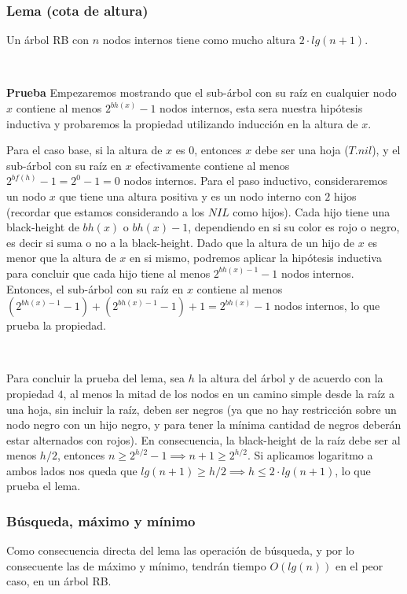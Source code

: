\subsubsection{Lema (cota de altura)}
Un \'arbol RB con $n$ nodos internos tiene como mucho altura $2\cdot lg(n+1)$.

~

\textbf{Prueba} Empezaremos mostrando que el sub-\'arbol con su ra\'iz en cualquier nodo $x$ contiene al menos $2^{bh(x)}-1$ nodos internos, esta sera nuestra hip\'otesis inductiva y probaremos la propiedad utilizando inducci\'on en la altura de $x$. 

Para el caso base, si la altura de $x$ es $0$, entonces $x$ debe ser una hoja ($T.nil$), y el sub-\'arbol con su ra\'iz en $x$ efectivamente contiene al menos $2^{bf(h)}-1 = 2^0 -1 = 0$ nodos internos. Para el paso inductivo, consideraremos un nodo $x$ que tiene una altura positiva y es un nodo interno con $2$ hijos (recordar que estamos considerando a los $NIL$ como hijos). Cada hijo tiene una black-height de $bh(x)$ o $bh(x)-1$, dependiendo en si su color es rojo o negro, es decir si suma o no a la black-height. Dado que la altura de un hijo de $x$ es menor que la altura de $x$ en si mismo, podremos aplicar la hip\'otesis inductiva para concluir que cada hijo tiene al menos $2^{bh(x)-1}-1$ nodos internos. Entonces, el sub-\'arbol con su ra\'iz en $x$ contiene al menos $(2^{bh(x)-1}-1) + (2^{bh(x)-1}-1) + 1 = 2^{bh(x)}-1$ nodos internos, lo que prueba la propiedad.

~

Para concluir la prueba del lema, sea $h$ la altura del \'arbol y de acuerdo con la propiedad $4$, al menos la mitad de los nodos en un camino simple desde la ra\'iz a una hoja, sin incluir la ra\'iz, deben ser negros (ya que no hay restricci\'on sobre un nodo negro con un hijo negro, y para tener la m\'inima cantidad de negros deber\'an estar alternados con rojos). En consecuencia, la black-height de la ra\'iz debe ser al menos $h/2$, entonces $n \geq 2^{h/2}-1 \implies n+1 \geq 2^{h/2}$. Si aplicamos logaritmo a ambos lados nos queda que $lg(n+1) \geq h/2 \implies h \leq 2 \cdot lg(n+1)$, lo que prueba el lema.

\subsubsection{B\'usqueda, m\'aximo y m\'inimo}

Como consecuencia directa del lema las operaci\'on de b\'usqueda, y por lo consecuente las de m\'aximo y m\'inimo, tendr\'an tiempo $O(lg(n))$ en el peor caso, en un \'arbol RB.


